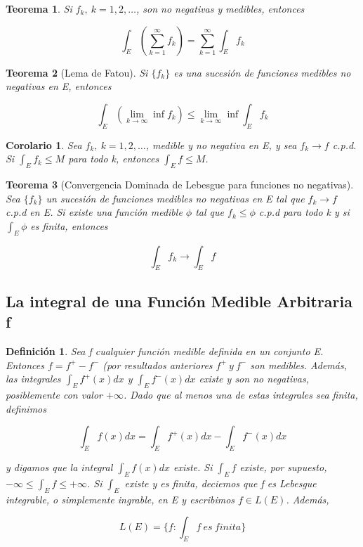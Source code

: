 \documentclass{article}
\newtheorem{theorem}{Teorema}
\newtheorem{corollary}{Corolario}
\newtheorem{definition}{Definición}
\begin{document}
\begin{theorem}
Si $f_k, \> k=1,2,\ldots$, son no negativas y medibles, entonces 

\begin{equation*}
\int_E (\sum_{k=1}^{\infty} f_k) = \sum_{k=1}^\infty \int_E f_k
\end{equation*}
\end{theorem}

\begin{theorem}[Lema de Fatou]
Si $\{f_k\}$ es una sucesión de funciones medibles no negativas en E, entonces

\begin{equation*}
\int_E (\lim_{k \to \infty} \inf f_k) \leq \lim_{k \to \infty} \inf \int_E f_k
\end{equation*}
\end{theorem}

\begin{corollary}
Sea $f_k,\> k=1,2,\ldots$, medible y no negativa en E, y sea $f_k \rightarrow f$ c.p.d. Si $\int_E f_k \leq M$ para todo k, entonces $\int_E f \leq M$.
\end{corollary}
\begin{theorem}[Convergencia Dominada de Lebesgue para funciones no negativas]
Sea $\{f_k\}$ un sucesión de funciones medibles no negativas en E tal que $f_k \rightarrow f$ c.p.d en E. Si existe una función medible $\phi$ tal que $f_k \leq \phi$ c.p.d para todo k y si $\int_E \phi$ es finita, entonces

\begin{equation*}
\int_E f_k \rightarrow \int_E f
\end{equation*}

\end{theorem}

\subsection{La integral de una Función Medible Arbitraria f}

\begin{definition}
Sea f cualquier función medible definida en un conjunto E. Entonces $f = f^+ - f^-$ (por resultados anteriores $f^+ \> y \> f^-$ son medibles. Además, las integrales $\int_E f^+(x) dx$ y $\int_E f^-(x) dx$ existe y son no negativas, posiblemente con valor $+\infty$. Dado que al menos una de estas integrales sea finita, definimos

\begin{equation*}
\int_E f(x) dx= \int_E f^+(x) dx - \int_E f^-(x)dx
\end{equation*}

y digamos que la integral $\int_E f(x) dx$ existe. Si $\int_E f$ existe, por supuesto, $-\infty \leq \int_E f \leq +\infty$. Si $\int_E$ existe y es finita, deciemos que f es Lebesgue integrable, o simplemente ingrable, en E y escribimos $f \in L(E)$. Además,

\begin{equation*}
L(E) = \{ f: \int_E f \> es \> finita\}
\end{equation*}
\end{definition}
\end{document}
